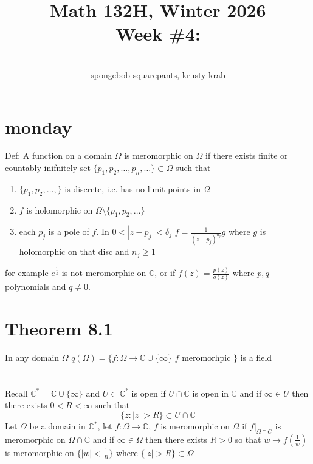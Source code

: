 \documentclass[11pt]{article}
\newcommand{\cnum}{Math 132H}
\newcommand{\ced}{Winter 2026}
\newcommand{\ctitle}[4]{\title{\vspace{-0.5in}\cnum, \ced\\Week #1: #2}\author{\vspace{-0.35in}\\#3, #4}}
\begin{document}
\ctitle{\#4}{}{spongebob squarepants}{krusty krab}
\date{}
\maketitle

\section{monday}
Def: A function on a domain $\Omega$ is meromorphic on  $\Omega$ if there
exists finite or countably inifnitely set  $\{p_1,p_2,\dots,p_n,\dots\} \subset \Omega$ such that
\begin{enumerate}
    \item $\{p_1,p_2,\dots,\}$ is discrete, i.e. has no limit points in $\Omega$
    \item  $f$ is holomorphic on $\Omega \setminus \{p_1,p_2,\dots\}$
    \item each $p_j$ is a pole of  $f$. In $ 0 < |z-p_j| < \delta_j$ $f = \frac{1}{(z-p_j)^{n_j}}g$ where $g$ is holomorphic on that disc and  $n_j \ge 1$
\end{enumerate}
for example $e^{\frac{1}{z}}$ is not meromorphic on $ \mathbb{C}$, or if $f(z) = \frac{p(z)}{q(z)}$ where $p,q$ polynomials and  $q \ne 0$.

\section{Theorem 8.1}
In any domain $\Omega$
$q(\Omega) = \{f : \Omega \rightarrow \mathbb{C} \cup \{\infty\}$ $f$ meromorhpic $\}$ is a field

\section{}
Recall $ \mathbb{C}^{*} = \mathbb{C} \cup \{\infty\}$ and $ U \subset \mathbb{C}^{*}$ is open if $U \cap \mathbb{C}$ is open in $ \mathbb{C}$ and if 
$ \infty \in U$ then there exists $0 < R < \infty$ such that
\[
\{z : |z| > R\} \subset U \cap \mathbb{C}
\] 
Let $\Omega$ be a domain in  $ \mathbb{C}^{*}$, let $f : \Omega \rightarrow \mathbb{C}$, $f$ is meromorphic on $\Omega$ if
$f|_{\Omega \cap C}$ is meromorphic on  $\Omega \cap \mathbb{C}$ and if $\infty \in \Omega$ then there exists $ R > 0$ so that  $w \rightarrow f(\frac{1}{w})$ is meromorphic on $\{|w| < \frac{1}{R}\}$ where $\{|z| > R\} \subset \Omega$
\end{document}
